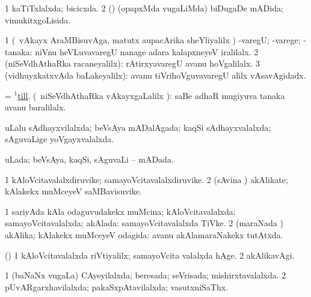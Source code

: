 \bentry
{} 
\gl{\gu}
\expl{}
\bmng
\bnum
\num{1} kaTiTxlalxda; bicicxda. 
\num{2} (\rUpa) (opapxMda \mo vugaLiMda) biDugaDe mADida; vimukitxgoLisida. 
\enum
\emng
\eentry

\bentry
{} 
\gl{\upa}
\expl{}
\bmng
\bnum
\num{1} (\kanmu\ vAkayx AraMBisuvAga, matutx aupacArika sheYliyalilx \parx) -varegU; -varege; -tanaka:  niVnu heVLuvavaregU nanage adara kalapxneyeV iralilalx. 
\num{2} (niSeVdhAthaRka racaneyalilx):  rAtirxyavaregU avanu hoVgalilalx. 
\num{3} (vidhuyxkatxvAda baLakeyalilx):  avanu tiVrihoVguvavaregU alilx vAsavAgidadx. 
\enum
\emng
\eentry

\bentry
{} 
\gl{\saMavayx}
\expl{}
\bmng
= \hyperref{kandict_t.pdf}{T}{till(1)}{$^1$till}. (\sA\ niSeVdhAthaRka vAkayxgaLalilx \parx):  saBe adhaR mugiyuva tanaka avanu baralilalx. 
\emng
\eentry

\bentry
{} 
\gl{\gu}
\expl{}
\bmng
uLalu sAdhayxvilalxda; beVsAya mADalAgada; kaqSi sAdhayxvalalxda; sAguvaLige yoVgayxvalalxda. 
\emng
\eentry

\bentry
{} 
\gl{\gu}
\expl{}
\bmng
uLada; beVsAya, kaqSi, sAguvaLi -- mADada. 
\emng
\eentry

\bentry
{} 
\gl{\nA}
\expl{}
\bmng
\bnum
\num{1} kAloVcitavalalxdiruvike; samayoVcitavalalxdiruvike. 
\num{2} (sAvina \vi) akAlikate; kAlakekx muMceyeV saMBavisuvike. 
\enum
\emng
\eentry

\bentry
{} 
\gl{\gu}
\expl{}
\bmng
\bnum
\num{1} sariyAda kAla odaguvudakekx muMcina; kAloVcitavalalxda; samayoVcitavalalxda; akAlada:  samayoVcitavalalxda TiVke. 
\num{2} (maraNada \vi) akAlika; kAlakekx muMceyeV odagida:  avanu akAlamaraNakekx tutAtxda. 
\enum
\emng
\eentry

\bentry
{} 
\gl{\kirxvi}
\expl{}
\bmng
(\pArxparx) 
\bnum
\num{1} kAloVcitavalalxda riVtiyalilx; samayoVcita valalxda hAge. 
\num{2} akAlikavAgi. 
\enum
\emng
\eentry

\bentry
{} 
\gl{\gu}
\expl{}
\bmng
\bnum
\num{1} (baNaNx \mo vugaLa) CAyeyilalxda; beresada; seVrisada; mishirxtavalalxda. 
\num{2} pUvARgarxhavilalxda; pakaSxpAtavilalxda; vasutxniSaThx. 
\enum
\emng
\eentry


